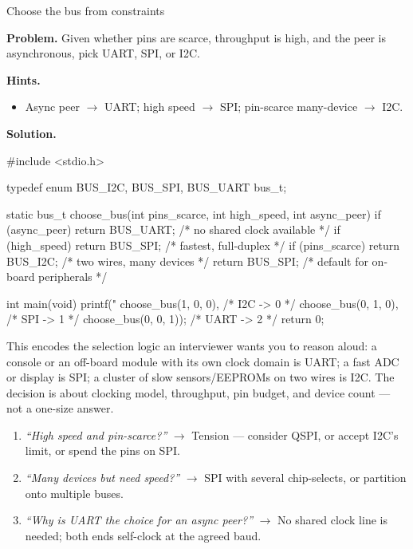 \begin{gymproblem}{Choose the bus from constraints}

\textbf{Problem.} Given whether pins are scarce, throughput is high, and the
peer is asynchronous, pick UART, SPI, or I2C.

\textbf{Hints.}
\begin{itemize}
\item Async peer $\rightarrow$ UART; high speed $\rightarrow$ SPI; pin-scarce
  many-device $\rightarrow$ I2C.
\end{itemize}

\attempt

\textbf{Solution.}
\begin{cgym}
#include <stdio.h>

typedef enum { BUS_I2C, BUS_SPI, BUS_UART } bus_t;

static bus_t choose_bus(int pins_scarce, int high_speed, int async_peer) {
    if (async_peer) return BUS_UART;      /* no shared clock available */
    if (high_speed) return BUS_SPI;       /* fastest, full-duplex      */
    if (pins_scarce) return BUS_I2C;      /* two wires, many devices   */
    return BUS_SPI;                       /* default for on-board peripherals */
}

int main(void) {
    printf("%
           choose_bus(1, 0, 0),   /* I2C  -> 0 */
           choose_bus(0, 1, 0),   /* SPI  -> 1 */
           choose_bus(0, 0, 1));  /* UART -> 2 */
    return 0;
}
\end{cgym}

This encodes the selection logic an interviewer wants you to reason aloud: a
console or an off-board module with its own clock domain is UART; a fast ADC or
display is SPI; a cluster of slow sensors/EEPROMs on two wires is I2C. The
decision is about clocking model, throughput, pin budget, and device count ---
not a one-size answer.

\followups
\begin{enumerate}
\item \emph{``High speed \emph{and} pin-scarce?''} $\rightarrow$ Tension ---
  consider QSPI, or accept I2C's limit, or spend the pins on SPI.
\item \emph{``Many devices but need speed?''} $\rightarrow$ SPI with several
  chip-selects, or partition onto multiple buses.
\item \emph{``Why is UART the choice for an async peer?''} $\rightarrow$ No
  shared clock line is needed; both ends self-clock at the agreed baud.
\end{enumerate}
\end{gymproblem}

